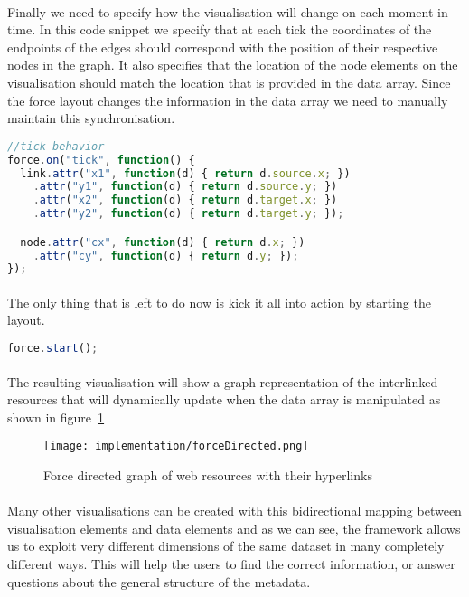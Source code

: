 	\paragraph{}
	Finally we need to specify how the visualisation will change on each moment in time. In this code snippet we specify that at each tick the coordinates of the endpoints of the edges should correspond with the position of their respective nodes in the graph. It also specifies that the location of the node elements on the visualisation should match the location that is provided in the data array. Since the force layout changes the information in the data array we need to manually maintain this synchronisation.
	\begin{lstlisting}[language=JavaScript]
//tick behavior
force.on("tick", function() {
  link.attr("x1", function(d) { return d.source.x; })
    .attr("y1", function(d) { return d.source.y; })
    .attr("x2", function(d) { return d.target.x; })
    .attr("y2", function(d) { return d.target.y; });

  node.attr("cx", function(d) { return d.x; })
    .attr("cy", function(d) { return d.y; });
});
	\end{lstlisting}
	\paragraph{}
	The only thing that is left to do now is kick it all into action by starting the layout.
	\begin{lstlisting}[language=JavaScript]
force.start();
	\end{lstlisting}
	\paragraph{}
	The resulting visualisation will show a graph representation of the interlinked resources that will dynamically update when the data array is manipulated as shown in figure~\ref{fig:forceDirected}
	\begin{figure}[h]
		\centering
		\texttt{[image: implementation/forceDirected.png]}
		\caption{Force directed graph of web resources with their hyperlinks}
		\label{fig:forceDirected}
	\end{figure}
	\paragraph{}
	Many other visualisations can be created with this bidirectional mapping between visualisation elements and data elements and as we can see, the framework allows us to exploit very different dimensions of the same dataset in many completely different ways. This will help the users to find the correct information, or answer questions about the general structure of the metadata.
	
